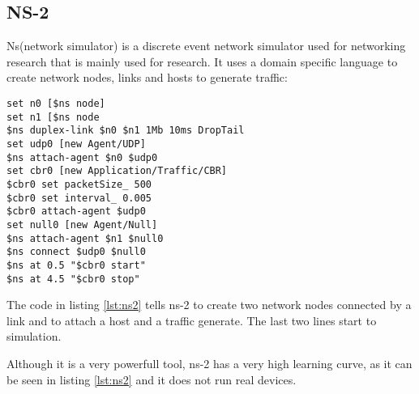 \subsection{NS-2}
Ns(network simulator) is a discrete event network simulator used for networking research that is
mainly used for research. It uses a domain specific language to create network nodes, links and
hosts to generate traffic:
\lstset{language=zsh, caption=NS-2 topology, label=lst:ns2}
\begin{lstlisting}
set n0 [$ns node]
set n1 [$ns node
$ns duplex-link $n0 $n1 1Mb 10ms DropTail
set udp0 [new Agent/UDP]
$ns attach-agent $n0 $udp0
set cbr0 [new Application/Traffic/CBR]
$cbr0 set packetSize_ 500
$cbr0 set interval_ 0.005
$cbr0 attach-agent $udp0
set null0 [new Agent/Null] 
$ns attach-agent $n1 $null0
$ns connect $udp0 $null0
$ns at 0.5 "$cbr0 start"
$ns at 4.5 "$cbr0 stop"
\end{lstlisting}
The code in listing \ref{lst:ns2} tells ns-2 to create two network nodes connected by a link
and to attach a host and a traffic generate. The last two lines start to simulation.

Although it is a very powerfull tool, ns-2 has a very high learning curve, as it can be seen
in listing \ref{lst:ns2} and it does not run real devices.
